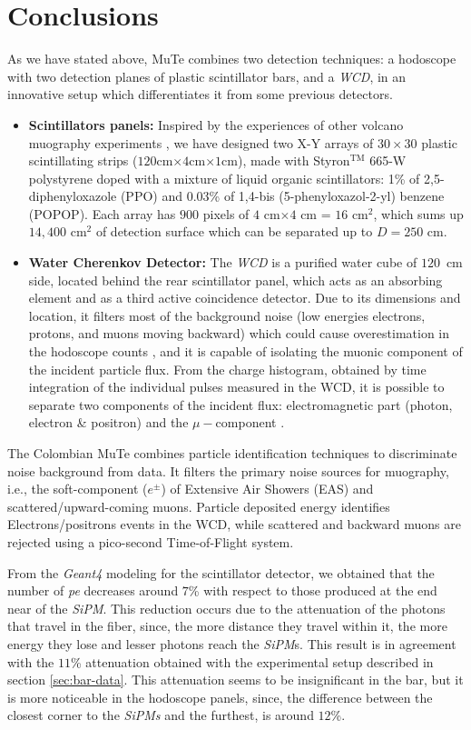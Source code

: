 \documentclass[submitting]{nst}
\begin{document}
\section{Conclusions}
\label{sec:conclusions}%
As we have stated above, MuTe combines two detection techniques: a hodoscope with two detection planes of plastic scintillator bars, and a \textsl{WCD}, in an innovative setup which differentiates it from some previous detectors. 
\begin{itemize}
    \item \textbf{Scintillators panels:} Inspired by the experiences of other volcano muography experiments \cite{UchidaTanakaTanaka2009,GibertEtal2010}, we have designed two X-Y  arrays of $30 \times 30$ plastic scintillating strips ($120$cm$\times 4$cm$\times 1$cm), made with Styron$^{\textrm{TM}}$ 665-W polystyrene doped with a mixture of liquid organic scintillators: 1\% of 2,5-diphenyloxazole (PPO) and 0.03\% of 1,4-bis (5-phenyloxazol-2-yl) benzene (POPOP). Each array has $900$ pixels of $4$ cm$\times 4$ cm = $16$ cm$^2$, which sums up $14,400$ cm$^2$ of detection surface which can be separated up to $D=250$ cm.
    \item \textbf{Water Cherenkov Detector:} The \textsl{WCD} is a purified water cube of $120$\, cm side, located behind the rear scintillator panel, which acts as an absorbing element and as a third active coincidence detector. Due to its dimensions and location, it filters most of the background noise (low energies electrons, protons, and muons moving backward) which could cause overestimation in the hodoscope counts \cite{NishiyamaEtal2016}, and it is capable of isolating the muonic component of the incident particle flux.  From the charge histogram, obtained by time integration of the individual pulses measured in the WCD, it is possible to separate two components of the incident flux: electromagnetic part (photon, electron \& positron) and the $\mu-$component \cite{AsoreyEtal2015B}.
\end{itemize}

The Colombian MuTe combines particle identification techniques to discriminate noise background from data. It filters the primary noise sources for muography, i.e., the soft-component ($e^{\pm}$) of Extensive Air Showers (EAS) and scattered/upward-coming muons. Particle deposited energy identifies Electrons/positrons events in the WCD, while scattered and backward muons are rejected using a pico-second Time-of-Flight system.

From the \textsl{Geant4} modeling for the scintillator detector, we obtained that the number of \textsl{pe} decreases around $7$\% with respect to those produced at the end near of the \textsl{SiPM}. This reduction occurs due to the attenuation of the photons that travel in the fiber, since, the more distance they travel within it, the more energy they lose and lesser photons reach the \textsl{SiPM}s. This result is in agreement with the $11$\% attenuation obtained with the experimental setup described in section \ref{sec:bar-data}. This attenuation seems to be insignificant in the bar, but it is more noticeable in the hodoscope panels, since, the difference between the closest corner to the \textsl{SiPMs} and the furthest, is around $12$\%.
\end{document}
